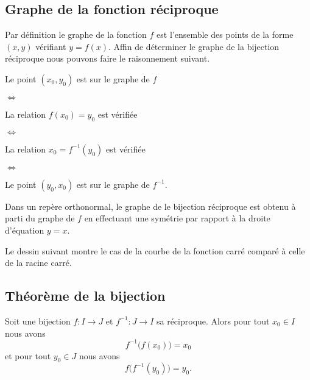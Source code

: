 \subsection{Graphe de la fonction réciproque}

Par définition le graphe de la fonction \( f\) est l'ensemble des points de la forme \( (x,y)\) vérifiant \( y=f(x)\). Affin de déterminer le graphe de la bijection réciproque nous pouvons faire le raisonnement suivant.

        Le point \( (x_0,y_0)\) est sur le graphe de \( f\)

\noindent\( \Leftrightarrow\)

        La relation \( f(x_0)=y_0\) est vérifiée

\noindent\( \Leftrightarrow\)

        La relation \( x_0=f^{-1}(y_0)\) est vérifiée

\noindent\( \Leftrightarrow\)

        Le point \( (y_0,x_0)\) est sur le graphe de \( f^{-1}\).

\begin{Aretenir}
    Dans un repère orthonormal, le graphe de le bijection réciproque est obtenu à parti du graphe de \( f\) en effectuant une symétrie par rapport à la droite d'équation \( y=x\).
\end{Aretenir}

Le dessin suivant montre le cas de la courbe de la fonction carré comparé à celle de la racine carré.
\begin{center}
   
\end{center}

\subsection{Théorème de la bijection}

\begin{proposition}
    Soit une bijection \( f\colon I\to J\) et \( f^{-1}\colon J\to I\) sa réciproque. Alors pour tout \( x_0\in I\) nous avons
    \begin{equation}    \label{EqHQRooNmLYbF}
        f^{-1}\big( f(x_0) \big)=x_0
    \end{equation}
    et pour tout \( y_0\in J\) nous avons
    \begin{equation}    \label{EqIYTooQPvZDr}
        f\big( f^{-1}(y_0) \big)=y_0.
    \end{equation}
\end{proposition}

